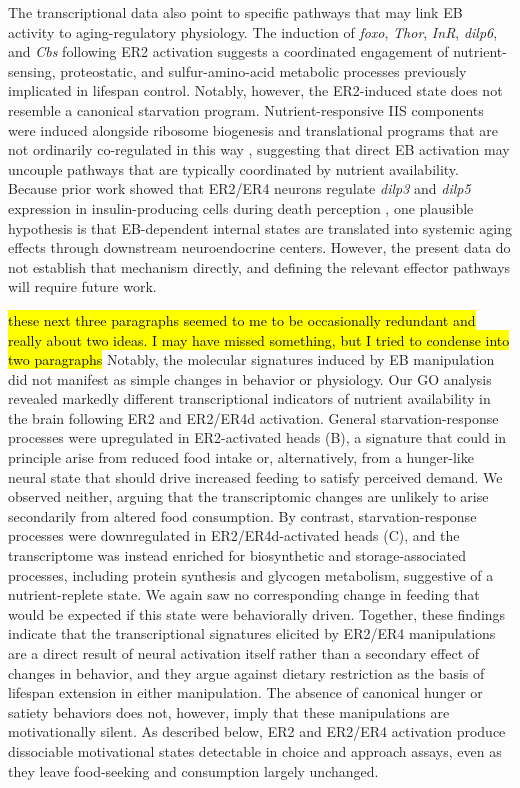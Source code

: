 The transcriptional data also point to specific pathways that may link EB activity to aging-regulatory physiology. 
The induction of \textit{foxo}, \textit{Thor}, \textit{InR}, \textit{dilp6}, and \textit{Cbs} following ER2 activation suggests a coordinated engagement of nutrient-sensing, proteostatic, and sulfur-amino-acid metabolic processes previously implicated in lifespan control. 
Notably, however, the ER2-induced state does not resemble a canonical starvation program. 
Nutrient-responsive IIS components were induced alongside ribosome biogenesis and translational programs that are not ordinarily co-regulated in this way \citep{essers2016}, suggesting that direct EB activation may uncouple pathways that are typically coordinated by nutrient availability. 
Because prior work showed that ER2/ER4 neurons regulate \textit{dilp3} and \textit{dilp5} expression in insulin-producing cells during death perception \citep{gendron2023}, one plausible hypothesis is that EB-dependent internal states are translated into systemic aging effects through downstream neuroendocrine centers. 
However, the present data do not establish that mechanism directly, and defining the relevant effector pathways will require future work.

\hl{these next three paragraphs seemed to me to be occasionally redundant and really about two ideas.  I may have missed something, but I tried to condense into two paragraphs}
Notably, the molecular signatures induced by EB manipulation did not manifest as simple changes in behavior or physiology. 
Our GO analysis revealed markedly different transcriptional indicators of nutrient availability in the brain following ER2 and ER2/ER4d activation. 
General starvation-response processes were upregulated in ER2-activated heads (B), a signature that could in principle arise from reduced food intake or, alternatively, from a hunger-like neural state that should drive increased feeding to satisfy perceived demand. 
We observed neither, arguing that the transcriptomic changes are unlikely to arise secondarily from altered food consumption.
By contrast, starvation-response processes were downregulated in ER2/ER4d-activated heads (C), and the transcriptome was instead enriched for biosynthetic and storage-associated processes, including protein synthesis and glycogen metabolism, suggestive of a nutrient-replete state.
We again saw no corresponding change in feeding that would be expected if this state were behaviorally driven. 
Together, these findings indicate that the transcriptional signatures elicited by ER2/ER4 manipulations are a direct result of neural activation itself rather than a secondary effect of changes in behavior, and they argue against dietary restriction as the basis of lifespan extension in either manipulation. 
The absence of canonical hunger or satiety behaviors does not, however, imply that these manipulations are motivationally silent. 
As described below, ER2 and ER2/ER4 activation produce dissociable motivational states detectable in choice and approach assays, even as they leave food-seeking and consumption largely unchanged.


